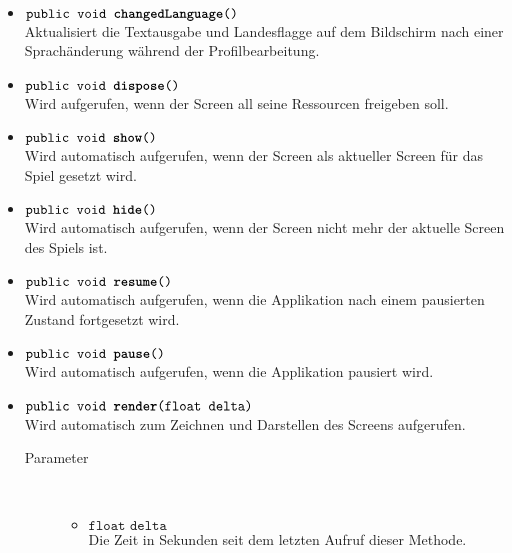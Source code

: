 \begin{description}
\begin{itemize}
		\item $\texttt{public void \textbf{changedLanguage}()}$ \\ Aktualisiert die Textausgabe und Landesflagge auf dem Bildschirm nach einer Sprachänderung während der Profilbearbeitung.
		
		\item $\texttt{public void \textbf{dispose}()}$ \\ Wird aufgerufen, wenn der Screen all seine Ressourcen freigeben soll.
		
		\item $\texttt{public void \textbf{show}()}$ \\ Wird automatisch aufgerufen, wenn der Screen als aktueller Screen für das Spiel gesetzt wird.
	
		\item $\texttt{public void \textbf{hide}()}$ \\ Wird automatisch aufgerufen, wenn der Screen nicht mehr der aktuelle Screen des Spiels ist.
	
		\item $\texttt{public void \textbf{resume}()}$ \\ Wird automatisch aufgerufen, wenn die Applikation nach einem pausierten Zustand fortgesetzt wird.	
	
		\item $\texttt{public void \textbf{pause}()}$ \\ Wird automatisch aufgerufen, wenn die Applikation pausiert wird.
	
		\item $\texttt{public void \textbf{render}(float delta)}$ \\ Wird automatisch zum Zeichnen und Darstellen des Screens aufgerufen.
		\begin{description}
			\item[Parameter] \hfill \\
			\vspace{-.8cm}
			\begin{itemize}
				\item $\texttt{float delta}$ \\ Die Zeit in Sekunden seit dem letzten Aufruf dieser Methode.
			\end{itemize}
		\end{description}	
	

\end{itemize}
\end{description}

